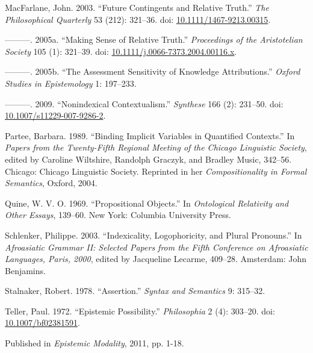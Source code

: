 \documentclass[
  10pt,
  letterpaper,
  DIV=11,
  numbers=noendperiod,
  twoside]{scrartcl}
\newlength{\cslhangindent}
\newenvironment{CSLReferences}[2] %
 {\begin{list}{}{%
  \setlength{\itemindent}{0pt}
  \setlength{\leftmargin}{0pt}
  \setlength{\parsep}{0pt}
  \ifodd #1
   \setlength{\leftmargin}{\cslhangindent}
   \setlength{\itemindent}{-1\cslhangindent}
  \fi
  \setlength{\itemsep}{#2\baselineskip}}}
 {\end{list}}
\begin{document}
\begin{CSLReferences}{1}{0}
MacFarlane, John. 2003. {``Future Contingents and Relative Truth.''}
\emph{The Philosophical Quarterly} 53 (212): 321--36. doi:
\href{https://doi.org/10.1111/1467-9213.00315}{10.1111/1467-9213.00315}.

---------. 2005a. {``{Making Sense of Relative Truth}.''}
\emph{Proceedings of the Aristotelian Society} 105 (1): 321--39. doi:
\href{https://doi.org/10.1111/j.0066-7373.2004.00116.x}{10.1111/j.0066-7373.2004.00116.x}.

---------. 2005b. {``The Assessment Sensitivity of Knowledge
Attributions.''} \emph{Oxford Studies in Epistemology} 1: 197--233.

---------. 2009. {``{Nonindexical Contextualism}.''} \emph{Synthese} 166
(2): 231--50. doi:
\href{https://doi.org/10.1007/s11229-007-9286-2}{10.1007/s11229-007-9286-2}.

Partee, Barbara. 1989. {``Binding Implicit Variables in Quantified
Contexts.''} In \emph{Papers from the Twenty-Fifth Regional Meeting of
the Chicago Linguistic Society}, edited by Caroline Wiltshire, Randolph
Graczyk, and Bradley Music, 342--56. Chicago: Chicago Linguistic
Society. Reprinted in her \emph{Compositionality in Formal Semantics},
Oxford, 2004.

Quine, W. V. O. 1969. {``Propositional Objects.''} In \emph{Ontological
Relativity and Other Essays}, 139--60. New York: Columbia University
Press.

Schlenker, Philippe. 2003. {``Indexicality, Logophoricity, and Plural
Pronouns.''} In \emph{Afroasiatic Grammar II: Selected Papers from the
Fifth Conference on Afroasiatic Languages, Paris, 2000}, edited by
Jacqueline Lecarme, 409--28. Amsterdam: John Benjamins.

Stalnaker, Robert. 1978. {``Assertion.''} \emph{Syntax and Semantics} 9:
315--32.

Teller, Paul. 1972. {``Epistemic Possibility.''} \emph{Philosophia} 2
(4): 303--20. doi:
\href{https://doi.org/10.1007/bf02381591}{10.1007/bf02381591}.

\end{CSLReferences}



\noindent Published in\emph{
Epistemic Modality}, 2011, pp. 1-18.
\end{document}
